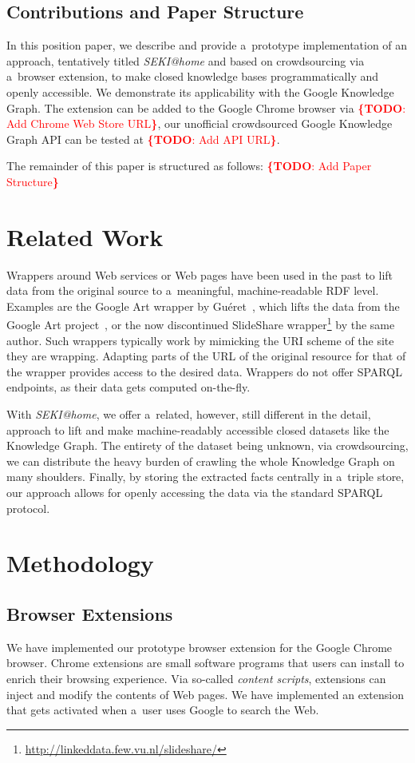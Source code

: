 \documentclass[runningheads,a4paper]{llncs}
\newcommand{\todo}[1]{\noindent\textcolor{red}{{\bf \{TODO}: #1{\bf \}}}}
\begin{document}
\subsection{Contributions and Paper Structure}
In this position paper, we describe and provide a~prototype implementation
of an approach, tentatively titled \emph{SEKI@home} and
based on crowdsourcing via a~browser extension,
to make closed knowledge bases programmatically and openly accessible.
We demonstrate its applicability with the Google Knowledge Graph.
The extension can be added to the Google Chrome browser via \todo{Add Chrome Web Store URL},
our unofficial crowdsourced Google Knowledge Graph API can be tested at
\todo{Add API URL}.

The remainder of this paper is structured as follows:
\todo{Add Paper Structure}

\section{Related Work}
Wrappers around Web services or Web pages have been used in the past
to lift data from the original source to a~meaningful, machine-readable RDF level.
Examples are the Google Art wrapper by Guéret~\cite{gueret2011},
which lifts the data from the Google Art project~\cite{sood2011},
or the now discontinued SlideShare wrapper\footnote{\url{http://linkeddata.few.vu.nl/slideshare/}} by the same author.
Such wrappers typically work by mimicking the URI scheme of the site they are wrapping.
Adapting parts of the URL of the original resource for that of the wrapper
provides access to the desired data.
Wrappers do not offer SPARQL endpoints, as their data gets computed on-the-fly.

With \emph{SEKI@home}, we offer a~related, however, still different in the detail,
approach to lift and make machine-readably accessible
closed datasets like the Knowledge Graph.
The entirety of the dataset being unknown,
via crowdsourcing, we can distribute the heavy burden
of crawling the whole Knowledge Graph on many shoulders.
Finally, by storing the extracted facts centrally in a~triple store,
our approach allows for openly accessing the data via the standard SPARQL protocol.

\section{Methodology}
\subsection{Browser Extensions}
We have implemented our prototype browser extension for the Google Chrome browser.
Chrome extensions are small software programs that users can install
to enrich their browsing experience.
Via so-called \emph{content scripts},
extensions can inject and modify the contents of Web pages.
We have implemented an extension that gets activated when a~user
uses Google to search the Web.
\end{document}
